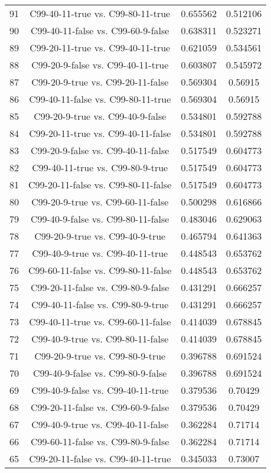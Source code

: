 \documentclass[a4paper,10pt]{article}
\begin{document}
\begin{landscape}
\begin{table}[!htp]
\begin{tabular}{cccc}
91&C99-40-11-true vs. C99-80-11-true&0.655562&0.512106\\
90&C99-40-11-false vs. C99-60-9-false&0.638311&0.523271\\
89&C99-20-11-true vs. C99-40-11-true&0.621059&0.534561\\
88&C99-20-9-false vs. C99-40-11-true&0.603807&0.545972\\
87&C99-20-9-true vs. C99-20-11-false&0.569304&0.56915\\
86&C99-40-11-false vs. C99-80-11-true&0.569304&0.56915\\
85&C99-20-9-true vs. C99-40-9-false&0.534801&0.592788\\
84&C99-20-11-true vs. C99-40-11-false&0.534801&0.592788\\
83&C99-20-9-false vs. C99-40-11-false&0.517549&0.604773\\
82&C99-40-11-true vs. C99-80-9-true&0.517549&0.604773\\
81&C99-20-11-false vs. C99-80-11-false&0.517549&0.604773\\
80&C99-20-9-true vs. C99-60-11-false&0.500298&0.616866\\
79&C99-40-9-false vs. C99-80-11-false&0.483046&0.629063\\
78&C99-20-9-true vs. C99-40-9-true&0.465794&0.641363\\
77&C99-40-9-true vs. C99-40-11-true&0.448543&0.653762\\
76&C99-60-11-false vs. C99-80-11-false&0.448543&0.653762\\
75&C99-20-11-false vs. C99-80-9-false&0.431291&0.666257\\
74&C99-40-11-false vs. C99-80-9-true&0.431291&0.666257\\
73&C99-40-11-true vs. C99-60-11-false&0.414039&0.678845\\
72&C99-40-9-true vs. C99-80-11-false&0.414039&0.678845\\
71&C99-20-9-true vs. C99-80-9-true&0.396788&0.691524\\
70&C99-40-9-false vs. C99-80-9-false&0.396788&0.691524\\
69&C99-40-9-false vs. C99-40-11-true&0.379536&0.70429\\
68&C99-20-11-false vs. C99-60-9-false&0.379536&0.70429\\
67&C99-40-9-true vs. C99-40-11-false&0.362284&0.71714\\
66&C99-60-11-false vs. C99-80-9-false&0.362284&0.71714\\
65&C99-20-11-false vs. C99-40-11-true&0.345033&0.73007\\

\end{tabular}
\end{table}
\end{landscape}
\end{document}
